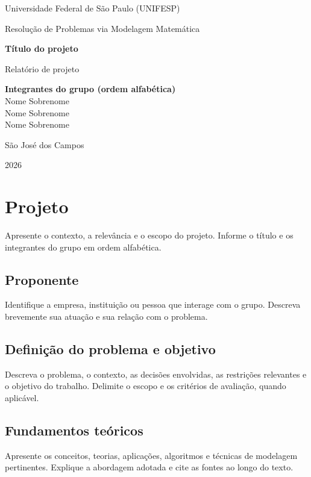 \documentclass[12pt,a4paper]{article}
\newcommand{\TituloProjeto}{Título do projeto}
\newcommand{\Disciplina}{Resolução de Problemas via Modelagem Matemática}
\newcommand{\Universidade}{Universidade Federal de São Paulo (UNIFESP)}
\newcommand{\Ano}{2026}
\begin{document}
\begin{titlepage}
    \centering
    {\large \Universidade\par}
    \vspace{1.5cm}
    {\large \Disciplina\par}
    \vspace{2.5cm}
    {\LARGE\bfseries \TituloProjeto\par}
    \vspace{1.5cm}
    {\large Relatório de projeto\par}
    \vfill
    \begin{minipage}{0.8\textwidth}
        \centering
        \textbf{Integrantes do grupo (ordem alfabética)}\\[0.4cm]
        Nome Sobrenome\\
        Nome Sobrenome\\
        Nome Sobrenome
    \end{minipage}
    \vfill
    {\large São José dos Campos\par}
    {\large \Ano\par}
\end{titlepage}

\tableofcontents
\newpage

\section{Projeto}
Apresente o contexto, a relevância e o escopo do projeto. Informe o título e os integrantes do grupo em ordem alfabética.

\subsection{Proponente}
Identifique a empresa, instituição ou pessoa que interage com o grupo. Descreva brevemente sua atuação e sua relação com o problema.

\subsection{Definição do problema e objetivo}
Descreva o problema, o contexto, as decisões envolvidas, as restrições relevantes e o objetivo do trabalho. Delimite o escopo e os critérios de avaliação, quando aplicável.

\subsection{Fundamentos teóricos}
Apresente os conceitos, teorias, aplicações, algoritmos e técnicas de modelagem pertinentes. Explique a abordagem adotada e cite as fontes ao longo do texto.
\end{document}
